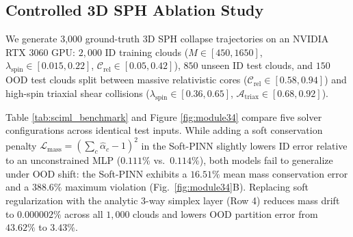 \documentclass[10pt,twocolumn,letterpaper]{article}
\begin{document}
\begin{table}[t]
\centering
\caption{\textbf{Coupled 3D Particle-Mesh Universe Evolution Benchmark (40 Symplectic KDK Steps, $16,000$ Particles, $64^3$ Grid, 48 Sub-Grid Collapses Producing 42 Stars and 9 Black Holes).}\ By resolving 33 ID clouds on the neural branch ($0.4\text{ ms}$) and batching all 15 ($31.2\%$) flagged OOD events into a single parallel GPU SPH call, SimplexGate-3D achieves a $50.1\times$ wall-clock speedup over event-driven SPH.}
\label{tab:coupled_universe}
\vspace{0.03in}
\end{table}

\subsection{Controlled 3D SPH Ablation Study}
We generate 3,000 ground-truth 3D SPH collapse trajectories on an NVIDIA RTX 3060 GPU: $2,000$ ID training clouds ($M \in [450, 1650]$, $\lambda_{\text{spin}} \in [0.015, 0.22]$, $\mathcal{C}_{\text{rel}} \in [0.05, 0.42]$), $850$ unseen ID test clouds, and $150$ OOD test clouds split between massive relativistic cores ($\mathcal{C}_{\text{rel}} \in [0.58, 0.94]$) and high-spin triaxial shear collisions ($\lambda_{\text{spin}} \in [0.36, 0.65]$, $\mathcal{A}_{\text{triax}} \in [0.68, 0.92]$).

Table \ref{tab:sciml_benchmark} and Figure \ref{fig:module34} compare five solver configurations across identical test inputs. While adding a soft conservation penalty $\mathcal{L}_{\text{mass}} = (\sum_c \hat{\alpha}_c - 1)^2$ in the Soft-PINN slightly lowers ID error relative to an unconstrained MLP ($0.111\%$ vs.\ $0.114\%$), both models fail to generalize under OOD shift: the Soft-PINN exhibits a $16.51\%$ mean mass conservation error and a $388.6\%$ maximum violation (Fig.\ \ref{fig:module34}B). Replacing soft regularization with the analytic 3-way simplex layer (Row 4) reduces mass drift to $0.000002\%$ across all $1,000$ clouds and lowers OOD partition error from $43.62\%$ to $3.43\%$.
\end{document}
